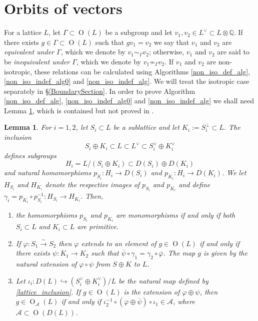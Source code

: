 \documentclass[12pt, a4paper]{article}
\newtheorem{lemma}[theorem]{Lemma}
\newcommand{\QQ}{\mathbb{Q}}
\newcommand{\beq}{\begin{equation*}}
\newcommand{\eeq}{\end{equation*}}
\newcommand{\Ac}{\mathcal{A}}
\newcommand{\opn}{\operatorname}
\newcommand{\op}{\oplus}
\begin{document}
 \section{Orbits of vectors}
For a lattice $L$, let $\Gamma \subset \opn{O}(L)$ be a subgroup and let $v_1, v_2 \in L^{\vee} \subset L \otimes \QQ$.
If there exists $g \in \Gamma \subset \opn{O}(L)$ such that $gv_1 = v_2$ we say that $v_1$ and $v_2$ are \emph{equivalent under $\Gamma$}, which we denote by  $v_1 \sim_{\Gamma} v_2$; otherwise,  $v_1$ and $v_2$ are said to be \emph{inequivalent under $\Gamma$}, which we denote by $v_1 \not \sim_{\Gamma} v_2$. 
If $v_1$ and $v_2$ are non-isotropic, these relations can be calculated using Algorithms \ref{non_iso_def_alg}, \ref{non_iso_indef_alg0} and \ref{non_iso_indef_alg}.
We will treat the isotropic case separately in \S\ref{BoundarySection}.
In order to prove Algorithm \ref{non_iso_def_alg}, \ref{non_iso_indef_alg0} and \ref{non_iso_indef_alg} we shall need Lemma \ref{extlem}, which is contained but not proved in \cite{Nikulin}.
\begin{lemma}\label{extlem}
  For $i=1,2$, let $S_i \subset L$ be a sublattice and let $K_i:=S_i^{\perp} \subset L$.
  The inclusion 
  \begin{equation}\label{lattice_inclusion}
  S_i \op K_i \subset L \subset L^{\vee} \subset S_i^{\vee} \op K_i^{\vee}
  \end{equation}
  defines subgroups
  \beq
  H_i = L/(S_i \op K_i) \subset D(S_i) \op D(K_i)
  \eeq
  and natural homomorphisms $p_{S_i}:H_i \rightarrow D(S_i)$ and $p_{K_i}:H_i \rightarrow D(K_i)$.
  We let $H_{S_i}$ and $H_{K_i}$ denote the respective images of $p_{S_i}$ and $p_{K_i}$ and define $\gamma_i=p_{K_i} \circ p_{S_i}^{-1}:H_{S_i} \rightarrow H_{K_i}$.
  Then, 
  \begin{enumerate}
  \item the homomorphisms $p_{S_i}$ and $p_{K_i}$ are monomorphisms if and only if both $S_i \subset L$ and $K_i \subset L$ are primitive.
  \item If $\varphi:S_1 \xrightarrow{\sim} S_2$ then $\varphi$ extends to an element of $g \in \opn{O}(L)$ if and only if there exists $\psi:K_1 \rightarrow K_2$ such that $\overline{\psi} \circ \gamma_1 = \gamma_2 \circ \overline{\varphi}$.
The map $g$ is given by the natural extension of $\varphi \circ \psi$ from $S \op K$ to $L$.
  \item Let $\iota_i:D(L) \hookrightarrow (S_i^{\vee} \op K_i^{\vee})/L$ be the natural map defined by \eqref{lattice_inclusion}.
    If $g \in \opn{O}(L)$ is the extension of $\varphi \op \psi$, then $g \in \opn{O}_{\Ac}(L)$ if and only if $\iota_2^{-1} \circ (\overline{\varphi} \op \overline{\psi} ) \circ \iota_1 \in \Ac$, where $\Ac \subset \opn{O}(D(L))$.
  \end{enumerate}
\end{lemma}
\end{document}
